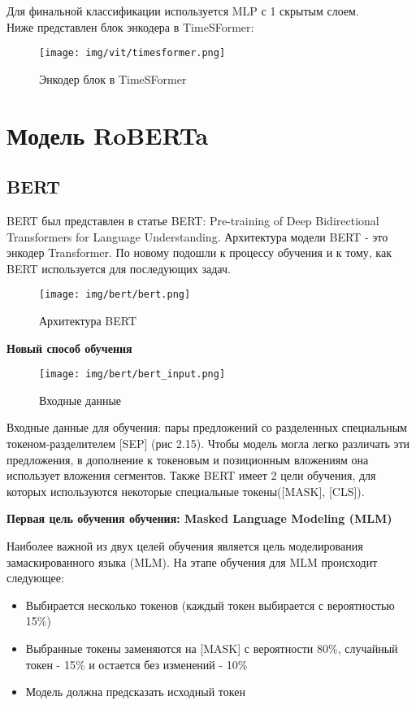 \documentclass[PMI,KR]{HSEUniversity}
\begin{document}
Для финальной классификации используется MLP с 1 скрытым слоем. \\

Ниже представлен блок энкодера в TimeSFormer:

\begin{figure}[h]
    \centering
    \texttt{[image: img/vit/timesformer.png]}
    \caption{Энкодер блок в TimeSFormer}
\end{figure}

\newpage
\section{Модель RoBERTa}

\subsection{BERT}

BERT был представлен в статье BERT: Pre-training of Deep Bidirectional Transformers for Language Understanding\cite{bert:2018}. Архитектура модели BERT - это энкодер Transformer. По новому подошли к процессу обучения и к тому, как BERT используется для последующих задач.

\begin{figure}[h]
    \centering
    \texttt{[image: img/bert/bert.png]}
    \caption{Архитектура BERT}
\end{figure}

\begin{center}
\textbf{Новый способ обучения}    
\end{center}

\begin{figure}[h]
    \centering
    \texttt{[image: img/bert/bert\_input.png]}
    \caption{Входные данные}
\end{figure}

Входные данные для обучения: пары предложений со  разделенных специальным токеном-разделителем [SEP] (рис 2.15). Чтобы модель могла легко различать эти предложения, в дополнение к токеновым и позиционным вложениям она использует вложения сегментов. Также BERT имеет 2 цели обучения, для которых используются некоторые специальные токены([MASK], [CLS]). \\

\begin{center}
\textbf{Первая цель обучения обучения: Masked Language Modeling (MLM)}    
\end{center}
 Наиболее важной из двух целей обучения является цель моделирования замаскированного языка (MLM). На этапе обучения для MLM происходит следующее:
 \begin{itemize}
     \item Выбирается несколько токенов (каждый токен выбирается с вероятностью 15\%)
     \item Выбранные токены заменяются на [MASK] с вероятности 80\%, случайный токен - 15\% и остается без изменений - 10\%
     \item Модель должна предсказать исходный токен
\end{itemize}
\end{document}

